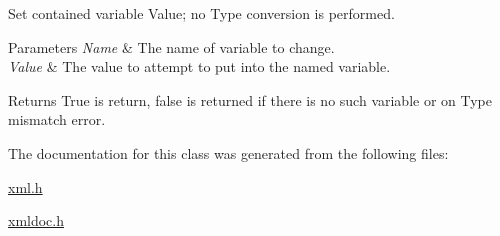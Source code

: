 Set contained variable Value; no Type conversion is performed. 


\begin{DoxyParams}{Parameters}
{\em Name} & The name of variable to change. \\
\hline
{\em Value} & The value to attempt to put into the named variable. \\
\hline
\end{DoxyParams}
\begin{DoxyReturn}{Returns}
True is return, false is returned if there is no such variable or on Type mismatch error. 
\end{DoxyReturn}


The documentation for this class was generated from the following files:\begin{DoxyCompactItemize}
\item 
\hyperlink{xml_8h}{xml.h}\item 
\hyperlink{xmldoc_8h}{xmldoc.h}\end{DoxyCompactItemize}
